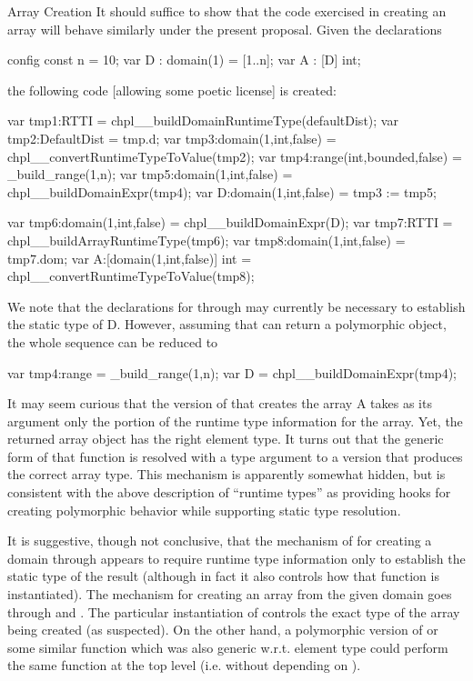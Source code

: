 \begin{chapelexample}{Array Creation}
It should suffice to show that the code exercised in creating an array will
behave similarly under the present proposal.  Given the declarations
\begin{chapel}
config const n = 10;
var D : domain(1) = [1..n];
var A : [D] int;
\end{chapel}
\noindent
the following code [allowing some poetic license] is created:
\begin{chapel}
var tmp1:RTTI = chpl__buildDomainRuntimeType(defaultDist);
var tmp2:DefaultDist = tmp.d;
var tmp3:domain(1,int,false) = chpl__convertRuntimeTypeToValue(tmp2);
var tmp4:range(int,bounded,false) = _build_range(1,n);
var tmp5:domain(1,int,false) = chpl__buildDomainExpr(tmp4);
var D:domain(1,int,false) = tmp3 := tmp5;

var tmp6:domain(1,int,false) = chpl__buildDomainExpr(D);
var tmp7:RTTI = chpl__buildArrayRuntimeType(tmp6);
var tmp8:domain(1,int,false) = tmp7.dom;
var A:[domain(1,int,false)] int = chpl__convertRuntimeTypeToValue(tmp8);
\end{chapel}
We note that the declarations for  through  may currently
be necessary to establish the static type of D.  However, assuming that
 can return a polymorphic object, the whole sequence can
be reduced to 
\begin{chapel}
var tmp4:range = _build_range(1,n);
var D = chpl__buildDomainExpr(tmp4);
\end{chapel}

It may seem curious that the version
of  that creates the array A takes as
its argument only the  portion of the runtime type information for
the array.  Yet, the returned array object has the right element type.  It turns
out that the generic form of that function is resolved with a type argument to a
version that produces the correct array type.  This mechanism is apparently
somewhat hidden, but is consistent with the above description of ``runtime
types'' as providing hooks for creating polymorphic behavior while supporting
static type resolution.

It is suggestive, though not conclusive, that the mechanism of
for creating a domain through  appears to require runtime
type information only to establish the static type of the result (although in
fact it also controls how that function is instantiated).  The mechanism for
creating an array from the given domain goes through  and
.  The particular instantiation of
  controls the exact type of the array being
created (as suspected).  On the other hand, a polymorphic version of
 or some similar function which was also generic w.r.t. element type
could perform the same function at the top level (i.e. without depending on
).


\end{chapelexample}
